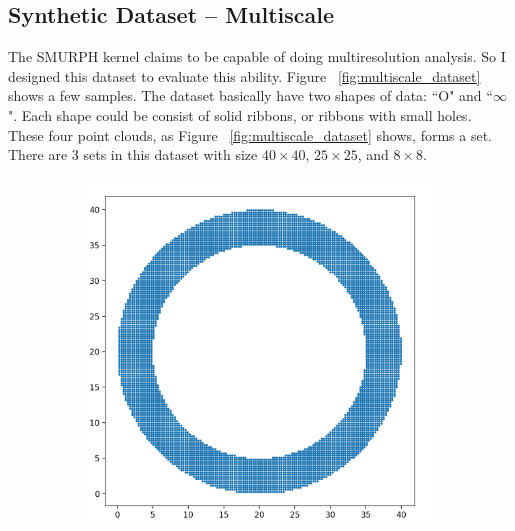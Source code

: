 \documentclass[10pt]{article}
\begin{document}
\subsection{Synthetic Dataset -- Multiscale}
The SMURPH kernel claims to be capable of doing multiresolution analysis.
So I designed this dataset to evaluate this ability.
Figure ~\ref{fig:multiscale_dataset} shows a few samples.
The dataset basically have two shapes of data: ``O" and ``$\infty$".
Each shape could be consist of solid ribbons, or ribbons with small holes.
These four point clouds, as Figure ~\ref{fig:multiscale_dataset} shows, forms a set.
There are 3 sets in this dataset with size $40 \times 40$, $25 \times 25$, and $8 \times 8$.

\begin{figure}[H]
    \centering
    \begin{subfigure}[h]{0.2\textwidth}
        \includegraphics[width=\linewidth]{ms_1}
    \end{subfigure}
    \begin{subfigure}[h]{0.2\textwidth}

\end{subfigure}
\end{figure}
\end{document}
